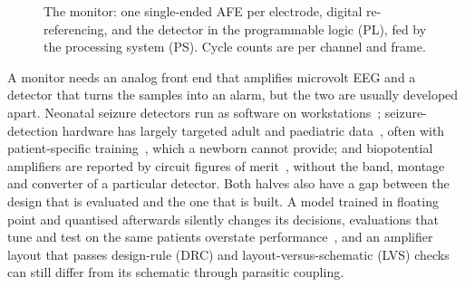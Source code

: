 \documentclass[conference]{IEEEtran}
\begin{document}
\begin{figure}[t]
\caption{The monitor: one single-ended AFE per electrode, digital re-referencing, and the detector in the programmable logic (PL), fed by the processing system (PS). Cycle counts are per channel and frame.}
\label{fig:system}
\end{figure}

A monitor needs an analog front end that amplifies microvolt EEG and a detector that turns the samples into an alarm, but the two are usually developed apart. Neonatal seizure detectors run as software on workstations~\cite{temko2011,ansari2019,oshea2020}; seizure-detection hardware has largely targeted adult and paediatric data~\cite{verma2010,busia2025,vittimberga2025}, often with patient-specific training~\cite{verma2010}, which a newborn cannot provide; and biopotential amplifiers are reported by circuit figures of merit~\cite{harrison2003,steyaert1987}, without the band, montage and converter of a particular detector. Both halves also have a gap between the design that is evaluated and the one that is built. A model trained in floating point and quantised afterwards silently changes its decisions, evaluations that tune and test on the same patients overstate performance~\cite{varma2006}, and an amplifier layout that passes design-rule (DRC) and layout-versus-schematic (LVS) checks can still differ from its schematic through parasitic coupling.
\end{document}
